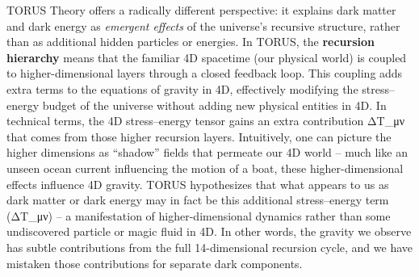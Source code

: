 \documentclass[
]{article}
\begin{document}
{TORUS Theory offers a radically different perspective: it explains dark
matter and dark energy as \emph{emergent effects} of the universe's
recursive structure, rather than as additional hidden particles or
energies. In TORUS, the \textbf{recursion hierarchy} means that the
familiar 4D spacetime (our physical world) is coupled to
higher-dimensional layers through a closed feedback loop. This coupling
adds extra terms to the equations of gravity in 4D, effectively
modifying the stress--energy budget of the universe without adding new
physical entities in 4D. In technical terms, the 4D stress--energy
tensor gains an extra contribution
ΔT_{μν}{} that comes
from those higher recursion layers\hspace{0pt}. Intuitively, one can
picture the higher dimensions as ``shadow'' fields that permeate our 4D
world -- much like an unseen ocean current influencing the motion of a
boat, these higher-dimensional effects influence 4D gravity. TORUS
hypothesizes that what appears to us as dark matter or dark energy may
in fact be this additional stress--energy term
(ΔT_{μν}) -- a
manifestation of higher-dimensional dynamics rather than some
undiscovered particle or magic fluid in 4D\hspace{0pt}. In other words,
the gravity we observe has subtle contributions from the full
14-dimensional recursion cycle, and we have mistaken those contributions
for separate dark components.

}
\end{document}
